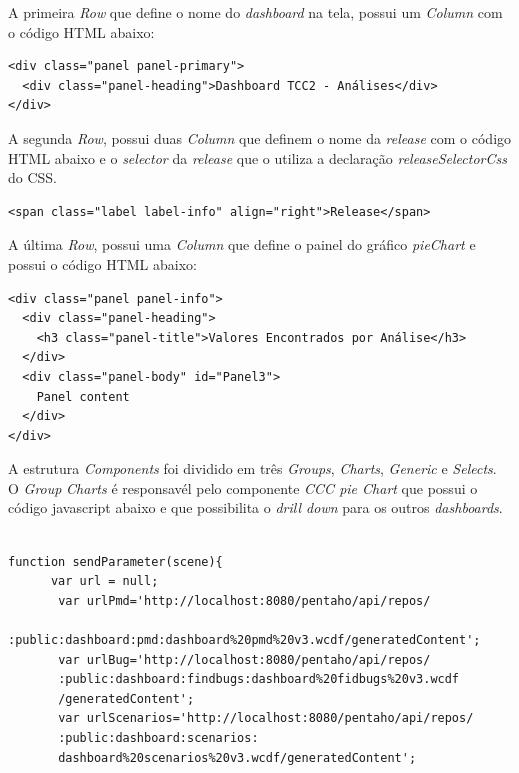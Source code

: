 \begin{apendicesenv}
{\begin{verbatim}
\end{verbatim}
}

A primeira \textit{Row} que define o nome do \textit{dashboard} na tela, possui um \textit{Column} com o código HTML abaixo:

{\color{blue}
\begin{verbatim}
<div class="panel panel-primary">
  <div class="panel-heading">Dashboard TCC2 - Análises</div>
</div> 
\end{verbatim}
}


A segunda \textit{Row}, possui duas \textit{Column} que definem o nome da \textit{release} com o código HTML abaixo e o \textit{selector} da \textit{release} que o utiliza a declaração \textit{releaseSelectorCss} do CSS.

{\color{blue}
\begin{verbatim}
<span class="label label-info" align="right">Release</span> 
\end{verbatim}
}

A última \textit{Row}, possui uma \textit{Column} que define o painel do gráfico \textit{pieChart} e possui o código HTML abaixo:

{\color{blue}
\begin{verbatim}
<div class="panel panel-info">
  <div class="panel-heading">
    <h3 class="panel-title">Valores Encontrados por Análise</h3>
  </div>
  <div class="panel-body" id="Panel3">
    Panel content
  </div>
</div> 
\end{verbatim}
}

A estrutura \textit{Components} foi dividido em três \textit{Groups}, \textit{Charts}, \textit{Generic} e \textit{Selects}. O \textit{Group} \textit{Charts} é responsavél pelo componente \textit{CCC pie Chart} que possui o código javascript abaixo e que possibilita o \textit{drill down} para os outros \textit{dashboards}.

{\color{blue}
\begin{verbatim}

function sendParameter(scene){
      var url = null;
       var urlPmd='http://localhost:8080/pentaho/api/repos/
       :public:dashboard:pmd:dashboard%20pmd%20v3.wcdf/generatedContent';
       var urlBug='http://localhost:8080/pentaho/api/repos/
       :public:dashboard:findbugs:dashboard%20fidbugs%20v3.wcdf
       /generatedContent';
       var urlScenarios='http://localhost:8080/pentaho/api/repos/
       :public:dashboard:scenarios:
       dashboard%20scenarios%20v3.wcdf/generatedContent';
       

\end{verbatim}}
\end{apendicesenv}
